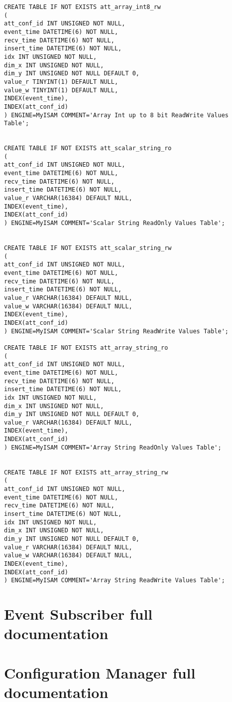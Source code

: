 \documentclass[11pt,a4paper]{article}
\def \es{Event Subscriber}
\def \cm{Configuration Manager}
\begin{document}
{\begin{Verbatim}
CREATE TABLE IF NOT EXISTS att_array_int8_rw
(
att_conf_id INT UNSIGNED NOT NULL,
event_time DATETIME(6) NOT NULL,
recv_time DATETIME(6) NOT NULL,
insert_time DATETIME(6) NOT NULL,
idx INT UNSIGNED NOT NULL,
dim_x INT UNSIGNED NOT NULL,
dim_y INT UNSIGNED NOT NULL DEFAULT 0,
value_r TINYINT(1) DEFAULT NULL,
value_w TINYINT(1) DEFAULT NULL,
INDEX(event_time),
INDEX(att_conf_id)
) ENGINE=MyISAM COMMENT='Array Int up to 8 bit ReadWrite Values Table';


CREATE TABLE IF NOT EXISTS att_scalar_string_ro
(
att_conf_id INT UNSIGNED NOT NULL,
event_time DATETIME(6) NOT NULL,
recv_time DATETIME(6) NOT NULL,
insert_time DATETIME(6) NOT NULL,
value_r VARCHAR(16384) DEFAULT NULL,
INDEX(event_time),
INDEX(att_conf_id)
) ENGINE=MyISAM COMMENT='Scalar String ReadOnly Values Table';


CREATE TABLE IF NOT EXISTS att_scalar_string_rw
(
att_conf_id INT UNSIGNED NOT NULL,
event_time DATETIME(6) NOT NULL,
recv_time DATETIME(6) NOT NULL,
insert_time DATETIME(6) NOT NULL,
value_r VARCHAR(16384) DEFAULT NULL,
value_w VARCHAR(16384) DEFAULT NULL,
INDEX(event_time),
INDEX(att_conf_id)
) ENGINE=MyISAM COMMENT='Scalar String ReadWrite Values Table';

CREATE TABLE IF NOT EXISTS att_array_string_ro
(
att_conf_id INT UNSIGNED NOT NULL,
event_time DATETIME(6) NOT NULL,
recv_time DATETIME(6) NOT NULL,
insert_time DATETIME(6) NOT NULL,
idx INT UNSIGNED NOT NULL,
dim_x INT UNSIGNED NOT NULL,
dim_y INT UNSIGNED NOT NULL DEFAULT 0,
value_r VARCHAR(16384) DEFAULT NULL,
INDEX(event_time),
INDEX(att_conf_id)
) ENGINE=MyISAM COMMENT='Array String ReadOnly Values Table';


CREATE TABLE IF NOT EXISTS att_array_string_rw
(
att_conf_id INT UNSIGNED NOT NULL,
event_time DATETIME(6) NOT NULL,
recv_time DATETIME(6) NOT NULL,
insert_time DATETIME(6) NOT NULL,
idx INT UNSIGNED NOT NULL,
dim_x INT UNSIGNED NOT NULL,
dim_y INT UNSIGNED NOT NULL DEFAULT 0,
value_r VARCHAR(16384) DEFAULT NULL,
value_w VARCHAR(16384) DEFAULT NULL,
INDEX(event_time),
INDEX(att_conf_id)
) ENGINE=MyISAM COMMENT='Array String ReadWrite Values Table';
	\end{Verbatim}
}


\newpage{\clearpage}

\section{\es{} full documentation}
\label{app:esfulldoc}


\newpage{\clearpage}

\section{\cm{} full documentation}
\label{app:cmfulldoc}

\end{document}

